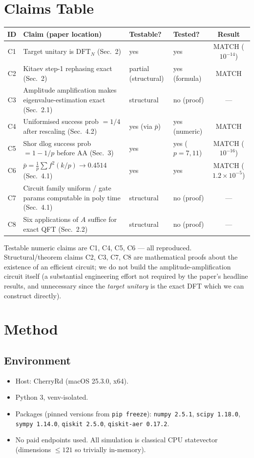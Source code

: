 \documentclass[11pt]{article}
\begin{document}
\section{Claims Table}
\begin{center}
\begin{tabular}{@{}clllc@{}}
\toprule
ID & Claim (paper location) & Testable? & Tested? & Result \\
\midrule
C1 & Target unitary is $\text{DFT}_N$ (Sec.~2) & yes & yes & MATCH ($10^{-14}$) \\
C2 & Kitaev step-1 rephasing exact (Sec.~2) & partial (structural) & yes (formula) & MATCH \\
C3 & Amplitude amplification makes eigenvalue-estimation exact (Sec.~2.1) & structural & no (proof) & --- \\
C4 & Uniformised success prob $= 1/4$ after rescaling (Sec.~4.2) & yes (via $\bar p$) & yes (numeric) & MATCH \\
C5 & Shor dlog success prob $= 1 - 1/p$ before AA (Sec.~3) & yes & yes ($p=7,11$) & MATCH ($10^{-16}$) \\
C6 & $\bar p = \frac{1}{p}\sum f^2(k/p) \to 0.4514$ (Sec.~4.1) & yes & yes & MATCH ($1.2\times 10^{-5}$) \\
C7 & Circuit family uniform / gate params computable in poly time (Sec.~4.1) & structural & no (proof) & --- \\
C8 & Six applications of $A$ suffice for exact QFT (Sec.~2.2) & structural & no (proof) & --- \\
\bottomrule
\end{tabular}
\end{center}

Testable numeric claims are C1, C4, C5, C6 --- all reproduced.
Structural/theorem claims C2, C3, C7, C8 are mathematical
proofs about the existence of an efficient circuit; we do not build the
amplitude-amplification circuit itself (a substantial engineering effort not
required by the paper's headline results, and unnecessary since the
\emph{target unitary} is the exact DFT which we can construct directly).

\section{Method}
\subsection{Environment}
\begin{itemize}
  \item Host: CherryRd (macOS 25.3.0, x64).
  \item Python 3, venv-isolated.
  \item Packages (pinned versions from \texttt{pip freeze}):
    \texttt{numpy 2.5.1}, \texttt{scipy 1.18.0}, \texttt{sympy 1.14.0},
    \texttt{qiskit 2.5.0}, \texttt{qiskit-aer 0.17.2}.
  \item No paid endpoints used. All simulation is classical CPU statevector
    (dimensions $\le 121$ so trivially in-memory).
\end{itemize}
\end{document}
